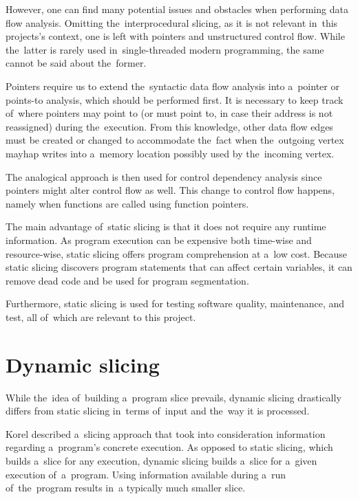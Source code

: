 However, one can find many potential issues and obstacles when performing 
data flow analysis. 
Omitting the~interprocedural slicing, as it is not relevant in~this projects's
context, one is left with pointers and unstructured control flow.
While the~latter is rarely used in~single-threaded modern programming, 
the same cannot be said about the~former. 

Pointers require us to extend the~syntactic data flow analysis 
into a~pointer or points-to analysis, which should be performed first. 
It is necessary to keep track of~where pointers may point to (or must point to,
in case their address is not reassigned) during the~execution. 
From this knowledge, other data flow edges must be created or
changed to accommodate the~fact when the~outgoing vertex mayhap writes
into a~memory location possibly used by the~incoming vertex. 

The analogical approach is then used for control dependency analysis since 
pointers might alter control flow as well. 
This change to control flow happens, namely when functions are called using 
function pointers.

The main advantage of~static slicing is that it does not require
any runtime information. 
As program execution can be expensive both time-wise and resource-wise, 
static slicing offers program comprehension at a~low cost. 
Because static slicing discovers program statements that can affect 
certain variables, it can remove dead code and be used for program segmentation. 

Furthermore, static slicing is used for testing software quality, maintenance, 
and test, all of~which are relevant to this project.

\section{Dynamic slicing}

While the~idea of~building a~program slice prevails, dynamic slicing 
drastically differs from static slicing in~terms of~input and the~way
it is processed. 

Korel \citep{Korel88} described a~slicing approach that took into 
consideration information regarding a~program's concrete execution. 
As opposed to static slicing, which builds a~slice for any execution, 
dynamic slicing builds a~slice for a~given execution of~a~program. 
Using information available during a~run of~the~program 
results in~a typically much smaller slice.

